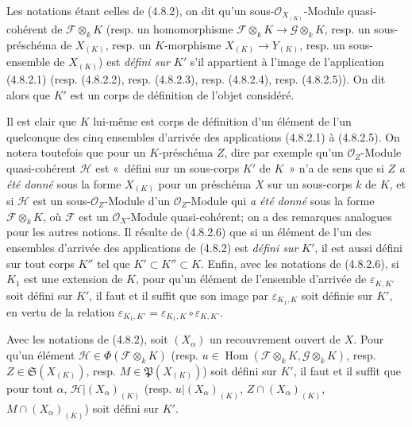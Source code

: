 \begin{definition}[4.8.4]
\label{IV.2.4.8.4-fr}
Les notations étant celles de \textup{(4.8.2)}, on dit qu'un
sous-$\mathcal O_{X_{(K)}}$-Module quasi-cohérent de
$\mathscr F\otimes_kK$ \textup{(resp.} un homomorphisme
$\mathscr F\otimes_kK\to\mathscr G\otimes_kK$, \textup{resp.} un sous-préschéma de
$X_{(K)}$, \textup{resp.} un $K$-morphisme $X_{(K)}\to Y_{(K)}$, \textup{resp.} un
sous-ensemble de $X_{(K)}$\textup{)} est \emph{défini sur $K'$} s'il appartient à
l'image de l'application \textup{(4.8.2.1) (resp. (4.8.2.2), resp. (4.8.2.3), resp.
(4.8.2.4), resp. (4.8.2.5))}. On dit alors que $K'$ est un corps de
définition de l'objet considéré.
\end{definition}

Il est clair que $K$ lui-même est corps de définition d'un élément de l'un
quelconque des cinq ensembles d'arrivée des applications (4.8.2.1) à
(4.8.2.5). On notera toutefois que pour un $K$-préschéma $Z$, dire par exemple
qu'un $\mathcal O_Z$-Module quasi-cohérent $\mathscr H$ est «~défini sur un
sous-corps $K'$ de $K$~» n'a de sens que si $Z$ \emph{a été donné} sous la
forme $X_{(K)}$ pour un préschéma $X$ sur un sous-corps $k$ de $K$, et si
$\mathscr H$ est un sous-$\mathcal O_Z$-Module d'un $\mathcal O_Z$-Module qui
\emph{a été donné} sous la forme $\mathscr F\otimes_kK$, où $\mathscr F$ est
un $\mathcal O_X$-Module quasi-cohérent; on a des remarques analogues pour les
autres notions. Il résulte de (4.8.2.6) que si un élément de l'un des ensembles
d'arrivée des applications de (4.8.2) est \emph{défini sur} $K'$, il est aussi défini
sur tout corps $K''$ tel que $K'\subset K''\subset K$. Enfin, avec les
notations de (4.8.2.6), si $K_1$ est une extension de $K$, pour qu'un élément
de l'ensemble d'arrivée de $\varepsilon_{K,K'}$ soit défini sur $K'$, il
faut et il suffit que son image par $\varepsilon_{K_1,K}$ soit définie sur
$K'$, en vertu de la relation
$\varepsilon_{K_1,K'}=\varepsilon_{K_1,K}\circ\varepsilon_{K,K'}$.

\begin{proposition}[4.8.5]
\label{IV.2.4.8.5-fr}
Avec les notations de \textup{(4.8.2)}, soit $(X_\alpha)$ un recouvrement ouvert de
$X$. Pour qu'un élément $\mathscr H\in\Phi(\mathscr F\otimes_kK)$ \textup{(resp.}
$u\in\operatorname{Hom}(\mathscr F\otimes_kK,\mathscr G\otimes_kK)$, \textup{resp.}
$Z\in\mathfrak S(X_{(K)})$, \textup{resp.} $M\in\mathfrak P(X_{(K)})$\textup{)} soit défini sur
$K'$, il faut et il suffit que pour tout $\alpha$,
$\mathscr H|(X_\alpha)_{(K)}$ \textup{(resp.} $u|(X_\alpha)_{(K)}$,
$Z\cap(X_\alpha)_{(K)}$, $M\cap(X_\alpha)_{(K)}$\textup{)} soit défini sur $K'$.
\end{proposition}

